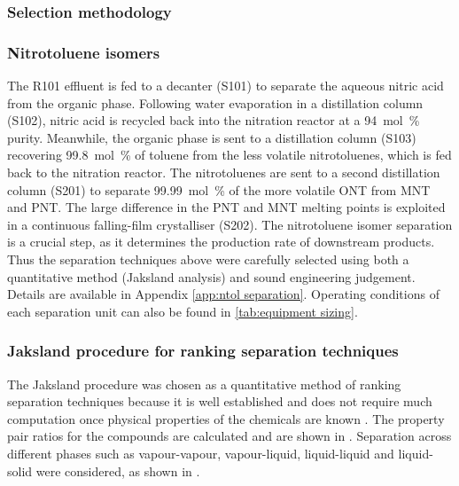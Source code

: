 \subsubsection{Selection methodology}

\subsubsection{Nitrotoluene isomers}

The R101 effluent is fed to a decanter (S101) to separate the aqueous nitric acid from the organic phase. Following water evaporation in a distillation column (S102), nitric acid is recycled back into the nitration reactor at a \SI{94}{mol\percent} purity.
Meanwhile, the organic phase is sent to a distillation column (S103) recovering \SI{99.8}{mol\percent} of toluene from the less volatile nitrotoluenes, which is fed back to the nitration reactor. The nitrotoluenes are sent to a second distillation column (S201) to separate \SI{99.99}{mol\percent} of the more volatile ONT from MNT and PNT. The large difference in the PNT and MNT melting points is exploited in a continuous falling-film crystalliser (S202). 
The nitrotoluene isomer separation is a crucial step, as it determines the production rate of downstream products. Thus the separation techniques above were carefully selected using both a quantitative method (Jaksland analysis) \cite{jaksland_separation_1995} and sound engineering judgement. Details are available in Appendix \ref{app:ntol separation}. Operating conditions of each separation unit can also be found in \cref{tab:equipment sizing}. 

\label{app:ntol separation}
\subsubsection{Jaksland procedure for ranking separation techniques}
The Jaksland procedure was chosen as a quantitative method of ranking separation techniques because it is well established and does not require much computation once physical properties of the chemicals are known \cite{jaksland_separation_1995}. The property pair ratios for the compounds are calculated and are shown in . Separation across different phases such as vapour-vapour, vapour-liquid, liquid-liquid and liquid-solid were considered, as shown in .

